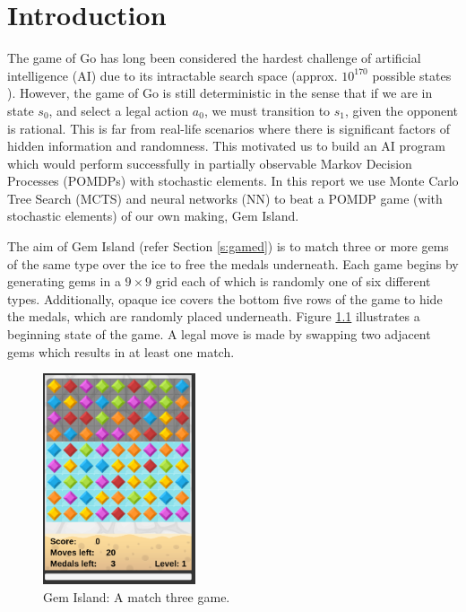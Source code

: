 \documentclass{bhamthesis}
\theoremstyle{definition}
\begin{document}
\tableofcontents
\listoffigures
\begingroup
\let\clearpage\relax
\listoftables
\endgroup
\mainmatter

\chapter{Introduction}
The game of Go has long been considered the hardest challenge of artificial intelligence (AI) due to its intractable search space (approx. $10^{170}$ possible states \cite{Gelly2012}). However, the game of Go is still deterministic in the sense that if we are in state $s_0$, and select a legal action $a_0$, we must transition to $s_1$, given the opponent is rational. This is far from real-life scenarios where there is significant factors of hidden information and randomness. This motivated us to build an AI program which would perform successfully in partially observable Markov Decision Processes (POMDPs) with stochastic elements. In this report we use Monte Carlo Tree Search (MCTS) and neural networks (NN) to beat a POMDP game (with stochastic elements) of our own making, Gem Island. 

The aim of Gem Island (refer Section \ref{s:gamed}) is to match three or more gems of the same type over the ice to free the medals underneath. Each game begins by generating gems in a $9 \times 9$ grid each of which is randomly one of six different types. Additionally, opaque ice covers the bottom five rows of the game to hide the medals, which are randomly placed underneath. Figure \ref{f:gemIsland} illustrates a beginning state of the game. A legal move is made by swapping two adjacent gems which results in at least one match.

\begin{figure}[h]
	\centering
	\includegraphics[width=0.4\textwidth]{media/img/screen2}
	\caption{Gem Island: A match three game.}\label{f:gemIsland}
\end{figure}
\end{document}
